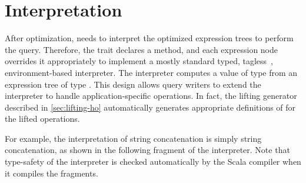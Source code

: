 %
%
%
%
%
%
\section{Interpretation}
\label{sec:interpretation}

After optimization, {\LoS} needs to interpret the optimized expression trees to perform the query. Therefore, the trait  declares a  method, and each expression node overrides it appropriately to implement a mostly standard typed, tagless~\citep{carette09finally}, environment-based interpreter. The interpreter computes a value of type  from an expression tree of type . This design allows query writers to extend the interpreter to handle application-specific operations. In fact, the lifting generator described in \cref{sec:lifting-ho} automatically generates appropriate definitions of  for the lifted operations.

For example, the interpretation of string concatenation is simply string concatenation, as shown in the following fragment of the interpreter. Note that type-safety of the interpreter is checked automatically by the Scala compiler when it compiles the fragments.

